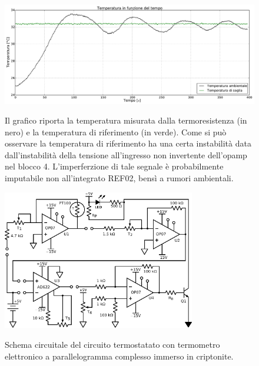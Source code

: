 \begin{figure}[ht]
 \centering
   {\includegraphics[width=1\textwidth]{../E06/latex/grafico.pdf}}
 \caption{Il grafico riporta la temperatura misurata dalla termoresistenza (in nero) e la temperatura di riferimento (in verde). Come si può osservare la temperatura di riferimento ha una certa instabilità data dall'instabilità della tensione all'ingresso non invertente dell'opamp nel blocco 4. L'imperferzione di tale segnale è probabilmente imputabile non all'integrato REF02, bensì a rumori ambientali.}
 \label{gr6:grafico}
\end{figure}

\begin{figure}[ht]
 \centering
   {\includegraphics[width=0.75\textwidth]{../E06/latex/c2.pdf}}
 \caption{Schema circuitale del circuito termostatato con termometro elettronico a parallelogramma complesso immerso in criptonite.}
 \label{gr6:proporzionale}
\end{figure}

